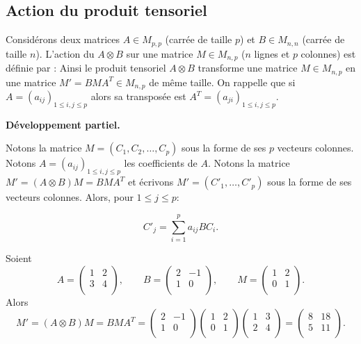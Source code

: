 \documentclass[11pt,class=report,crop=false]{standalone}
\begin{document}
\subsection{Action du produit tensoriel}

Considérons deux matrices $A \in M_{p,p}$ (carrée de taille $p$) et $B \in M_{n,n}$ (carrée de taille $n$).
L'action du  $A \otimes B$ sur une matrice $M \in M_{n,p}$ ($n$ lignes et $p$ colonnes) est définie par :
Ainsi le produit tensoriel $A \otimes B$ transforme une matrice $M \in M_{n,p}$ en une matrice $M' =B M A^T \in M_{n,p}$ de même taille.
On rappelle que si $A = (a_{ij})_{1 \le i,j \le p}$ alors sa transposée est $A^T = (a_{ji})_{1 \le i,j \le p}$.

\bigskip

\textbf{Développement partiel.}

Notons la matrice $M = (C_1, C_2, \ldots, C_p)$ sous la forme de ses $p$ vecteurs colonnes.
Notons $A = (a_{ij})_{1 \le i,j \le p}$ les coefficients de $A$.
Notons la matrice $M' = (A \otimes B) M = BMA^T$ et écrivons $M' = (C'_1, \ldots, C'_p)$ sous la forme de ses vecteurs colonnes.
Alors, pour $1 \le j \le p$: 

\begin{equation}
	\label{eq:produittensoriel}
	\tag{\dag}
	C'_j = \sum_{i=1}^p a_{ij} BC_i.
\end{equation}



\begin{exemple}
	Soient
$$A = 
\begin{pmatrix}
1 & 2 \\ 
3 & 4 \\
\end{pmatrix},
\qquad
B = 
\begin{pmatrix}
2 & -1 \\
1 & 0 \\
\end{pmatrix},
\qquad
M = 
\begin{pmatrix}
1 & 2 \\
0 & 1 \\
\end{pmatrix}.
$$
Alors 
$$
M' = (A \otimes B) M = BMA^T = 
\begin{pmatrix}
	2 & -1 \\
	1 & 0 \\
\end{pmatrix}
\begin{pmatrix}
	1 & 2 \\
	0 & 1 \\
\end{pmatrix}
\begin{pmatrix}
	1 & 3 \\ 
	2 & 4 \\
\end{pmatrix}
=
\begin{pmatrix}
	8 & 18 \\ 
	5 & 11 \\
\end{pmatrix}.
$$
\end{exemple}
\end{document}
